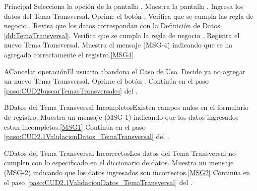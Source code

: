 	\begin{UCtrayectoria}{Principal}
			\UCpaso[\UCactor] Selecciona la opción  de la pantalla .
			\UCpaso Muestra la pantalla .
			\UCpaso [\UCactor] Ingresa los datos del Tema Transversal.  \label{paso:CUD2.1ValidacionDatos_TemaTransversal}
			\UCpaso [\UCactor] Oprime el botón .
			\UCpaso Verifica que se cumpla las regla de negocio .  
			\UCpaso Revisa que los datos correspondan con la Definición de Datos \ref{dd:TemaTransversal}. 
			\UCpaso Verifica que se cumpla la regla de negocio .  
			\UCpaso Registra el nuevo Tema Transversal.
			\UCpaso Muestra el mensaje (MSG-4) indicando que se ha agregado correctamente el registro.\ref{MSG4}
	\end{UCtrayectoria}

	\begin{UCtrayectoriaA}{A}{Cancelar operación}{El usuario abandona el Caso de Uso.}
			\UCpaso[\UCactor] Decide ya no agregar un nuevo Tema Transversal.
			\UCpaso[\UCactor] Oprime el botón .
			\UCpaso Continúa en el paso \ref{paso:CUD2buscarTemasTransversales} del .
	\end{UCtrayectoriaA}
		
	\begin{UCtrayectoriaA}{B}{Datos del Tema Transversal Incompletos}{Existen campos nulos en el formulario de registro.}
			\UCpaso Muestra un mensaje (MSG-1) indicando que los datos ingresados estan incompletos.\ref{MSG1}
			\UCpaso Continúa en el paso \ref{paso:CUD2.1ValidacionDatos_TemaTransversal} del .
	\end{UCtrayectoriaA}

	\begin{UCtrayectoriaA}{C}{Datos del Tema Transversal Incorrectos}{Los datos del Tema Transversal no cumplen con lo especificado en el diccionario de datos.}
			\UCpaso Muestra un mensaje (MSG-2) indicando que los datos ingresados son incorrectos.\ref{MSG2}
			\UCpaso Continúa en el paso \ref{paso:CUD2.1ValidacionDatos_TemaTransversal} del .
	\end{UCtrayectoriaA}

